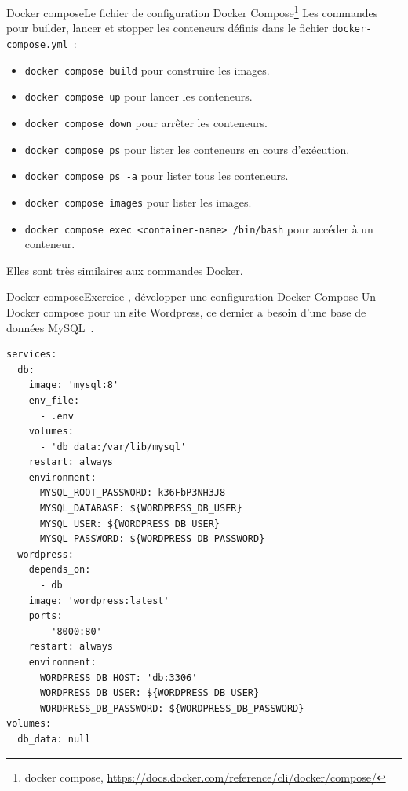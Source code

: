 \documentclass{beamer}
\begin{document}
    \begin{frame}[fragile]{Docker compose}{Le fichier de configuration Docker Compose\footnote{docker compose, \url{https://docs.docker.com/reference/cli/docker/compose/}}}
        Les commandes pour builder, lancer et stopper les conteneurs définis dans le fichier \lstinline{docker-compose.yml}~:
        \begin{itemize}
            \item \lstinline{docker compose build} pour construire les images.
            \item \lstinline{docker compose up} pour lancer les conteneurs.
            \item \lstinline{docker compose down} pour arrêter les conteneurs.
            \item \lstinline{docker compose ps} pour lister les conteneurs en cours d'exécution.
            \item \lstinline{docker compose ps -a} pour lister tous les conteneurs.
            \item \lstinline{docker compose images} pour lister les images.
            \item \lstinline{docker compose exec <container-name> /bin/bash} pour accéder à un conteneur.
        \end{itemize}
        Elles sont très similaires aux commandes Docker.
    \end{frame}

    \begin{frame}[fragile]{Docker compose}{Exercice \execcounterdispinc{}, développer une configuration Docker Compose}
        Un Docker compose pour un site Wordpress, ce dernier a besoin d'une base de données MySQL~.
        \pause
        \begin{lstlisting}[basicstyle=\ttfamily\tiny]
services:
  db:
    image: 'mysql:8'
    env_file:
      - .env
    volumes:
      - 'db_data:/var/lib/mysql'
    restart: always
    environment:
      MYSQL_ROOT_PASSWORD: k36FbP3NH3J8
      MYSQL_DATABASE: ${WORDPRESS_DB_USER}
      MYSQL_USER: ${WORDPRESS_DB_USER}
      MYSQL_PASSWORD: ${WORDPRESS_DB_PASSWORD}
  wordpress:
    depends_on:
      - db
    image: 'wordpress:latest'
    ports:
      - '8000:80'
    restart: always
    environment:
      WORDPRESS_DB_HOST: 'db:3306'
      WORDPRESS_DB_USER: ${WORDPRESS_DB_USER}
      WORDPRESS_DB_PASSWORD: ${WORDPRESS_DB_PASSWORD}
volumes:
  db_data: null
        \end{lstlisting}
    \end{frame}
\end{document}
